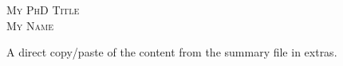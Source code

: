 




\pagestyle{empty}
{\centering

\fontsize{29}{29}\scshape
My PhD Title
\\[1cm]%

\fontsize{18}{18}\normalfont
My Name\\[1cm]%
}
\fontsize{11}{15}\normalfont

A direct copy/paste of the content from the summary file in extras.

